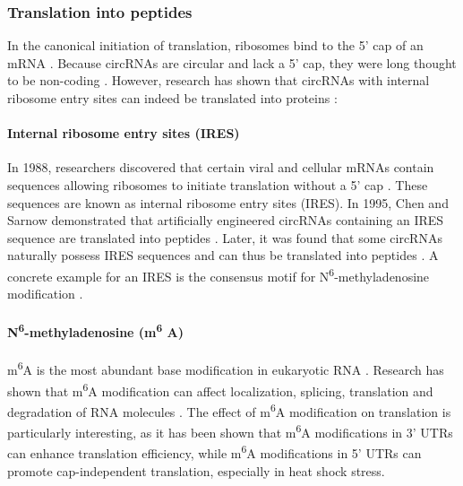 \subsubsection{Translation into peptides}
In the canonical initiation of translation, ribosomes bind to the 5' cap of an
mRNA \supercite{hinnebusch_mechanism_2012}.
Because circRNAs are circular and lack a 5' cap, they were long thought to be
non-coding \supercite{bao_regulatory_2019,greene_circular_2017}.
However, research has shown that circRNAs with internal ribosome entry sites
can indeed be translated into proteins \supercite{chen_expanding_2020}:

\paragraph{Internal ribosome entry sites (IRES)} In 1988, researchers
discovered that certain viral and cellular mRNAs contain sequences allowing
ribosomes to initiate translation without a 5' cap
\supercite{pelletier_internal_1988, jang_segment_1988}.
These sequences are known as internal ribosome entry sites (IRES).
In 1995, Chen and Sarnow demonstrated that artificially engineered circRNAs
containing an IRES sequence are translated into peptides
\supercite{chen_initiation_1995}.
Later, it was found that some circRNAs naturally possess IRES sequences and can
thus be translated into peptides
\supercite{chen_expanding_2020,legnini_circ-znf609_2017,pamudurti_translation_2017}.
A concrete example for an IRES is the consensus motif for
N\textsuperscript{6}-methyladenosine modification
\supercite{yang_extensive_2017}.

\paragraph{N\textsuperscript{6}-methyladenosine (m\textsuperscript{6}
    A)}  m\textsuperscript{6}A is the most abundant base modification in eukaryotic
RNA \supercite{yang_extensive_2017,li_pivotal_2014,wei_methylated_1975}.
Research has shown that m\textsuperscript{6}A modification can affect
localization, splicing, translation and degradation of RNA molecules
\supercite{yue_rna_2015,meyer_dynamic_2014}.
The effect of m\textsuperscript{6}A modification on translation is particularly
interesting, as it has been shown that m\textsuperscript{6}A modifications in
3' UTRs can enhance translation
efficiency\supercite{wang_n6-methyladenosine_2015}, while m\textsuperscript{6}A
modifications in 5' UTRs can promote cap-independent translation, especially in
heat shock stress\supercite{zhou_dynamic_2015,meyer_5_2015}.

